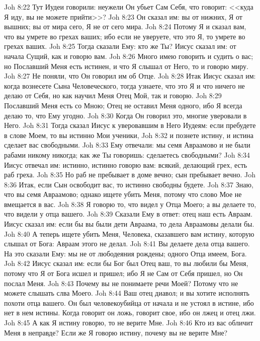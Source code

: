 \vs Joh 8:22 Тут Иудеи говорили: неужели Он убьет Сам Себя, что говорит: <<куда Я иду, вы не можете прийти>>?
\vs Joh 8:23 Он сказал им: вы от нижних, Я от вышних; вы от мира сего, Я не от сего мира.
\vs Joh 8:24 Потому Я и сказал вам, что вы умрете во грехах ваших; ибо если не уверуете, что это Я, то умрете во грехах ваших.
\vs Joh 8:25 Тогда сказали Ему: кто же Ты? Иисус сказал им: от начала Сущий, как и говорю вам.
\vs Joh 8:26 Много имею говорить и судить о вас; но Пославший Меня есть истинен, и что Я слышал от Него, то и говорю миру.
\vs Joh 8:27 Не поняли, что Он говорил им об Отце.
\vs Joh 8:28 Итак Иисус сказал им: когда вознесете Сына Человеческого, тогда узнаете, что это Я и что ничего не делаю от Себя, но как научил Меня Отец Мой, так и говорю.
\vs Joh 8:29 Пославший Меня есть со Мною; Отец не оставил Меня одного, ибо Я всегда делаю то, что Ему угодно.
\vs Joh 8:30 Когда Он говорил это, многие уверовали в Него.
\vs Joh 8:31 Тогда сказал Иисус к уверовавшим в Него Иудеям: если пребудете в слове Моем, то вы истинно Мои ученики,
\vs Joh 8:32 и познете истину, и истина сделает вас свободными.
\vs Joh 8:33 Ему отвечали: мы семя Авраамово и не были рабами никому никогда; как же Ты говоришь: сделаетесь свободными?
\vs Joh 8:34 Иисус отвечал им: истинно, истинно говорю вам: всякий, делающий грех, есть раб греха.
\vs Joh 8:35 Но раб не пребывает в доме вечно; сын пребывает вечно.
\vs Joh 8:36 Итак, если Сын освободит вас, то истинно свободны будете.
\vs Joh 8:37 Знаю, что вы семя Авраамово; однако ищете убить Меня, потому что слово Мое не вмещается в вас.
\vs Joh 8:38 Я говорю то, что видел у Отца Моего; а вы делаете то, что видели у отца вашего.
\vs Joh 8:39 Сказали Ему в ответ: отец наш есть Авраам. Иисус сказал им: если бы вы были дети Авраама, то дела Авраамовы делали бы.
\vs Joh 8:40 А теперь ищете убить Меня, Человека, сказавшего вам истину, которую слышал от Бога: Авраам этого не делал.
\vs Joh 8:41 Вы делаете дела отца вашего. На это сказали Ему: мы не от любодеяния рождены; одного Отца имеем, Бога.
\vs Joh 8:42 Иисус сказал им: если бы Бог был Отец ваш, то вы любили бы Меня, потому что Я от Бога исшел и пришел; ибо Я не Сам от Себя пришел, но Он послал Меня.
\vs Joh 8:43 Почему вы не понимаете речи Моей? Потому что не можете слышать слва Моего.
\vs Joh 8:44 Ваш отец диавол; и вы хотите исполнять похоти отца вашего. Он был человекоубийца от начала и не устоял в истине, ибо нет в нем истины. Когда говорит он ложь, говорит свое, ибо он лжец и отец лжи.
\vs Joh 8:45 А как Я истину говорю, то не верите Мне.
\vs Joh 8:46 Кто из вас обличит Меня в неправде? Если же Я говорю истину, почему вы не верите Мне?
